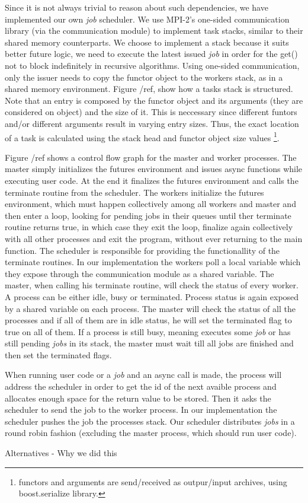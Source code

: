 Since it is not always trivial to reason about such dependencies, we have implemented our own \emph{job} 
scheduler.  We use MPI-2's one-sided communication library (via the communication module) to implement task
stacks, similar to their shared memory counterparts. We choose to implement a stack because it suits better
future logic, we need to execute the latest issued \emph{job} in order for the get() not to block indefinitely
in recursive algorithms.  Using one-sided communication, only the issuer needs to copy the functor object to
the workers stack, as in a shared memory environment.  Figure /ref, show how a tasks stack is structured.  
Note that an entry is composed by the functor object and its arguments (they are considered on object) and the 
size of it. This is neccessary since different funtors and/or different arguments result in varying entry sizes.
Thus, the exact location of a task is calculated using the stack head and functor object size values \footnote{
functors and arguments are send/received as outpur/input archives, using boost.serialize library.}.


Figure /ref shows a control flow graph for the master and worker processes.  The master simply initializes
the futures environment and issues async functions while executing user code.  At the end it finalizes 
the futures environment and calls the terminate routine from the scheduler.  The workers initialize 
the futures environment, which must happen collectively among all workers and master and then enter a
loop, looking for pending jobs in their queues until ther terminate routine returns true, in which case
they exit the loop, finalize again collectively with all other processes and exit the program, without ever
returning to the main function.  The scheduler is responsible for providing the functionallity of the terminate
routines.  In our implementation the workers poll a local variable which they expose through the communication
module as a shared variable.  The master, when calling his terminate routine, will check the status of every 
worker.  A process can be either idle, busy or terminated.  Process status is again exposed by a shared variable
on each process.  The master will check the status of all the processes and if all of them are in idle status, he
will set the terminated flag to true on all of them.  If a process is still busy, meaning executes some \emph{job}
or has still pending \emph{jobs} in its stack, the master must wait till all jobs are finished and then set the 
terminated flags.

When running user code or a \emph{job} and an async call is made, the process will address the scheduler in order
to get the id of the next avaible process and allocates enough space for the return value to be stored.
Then it asks the scheduler to send the job to the worker process.  In our implementation the scheduler 
pushes the job the processes stack.  Our scheduler distributes \emph{jobs} in a round robin fashion 
(excluding the master process, which should run user code). 


      
         
Alternatives - Why we did this

